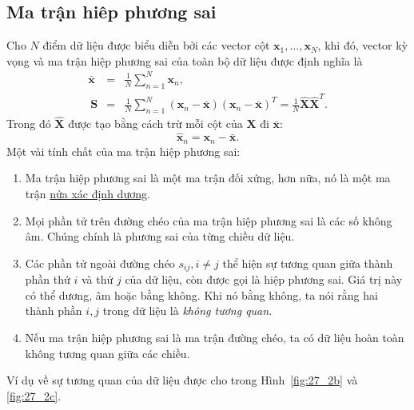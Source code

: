 \subsection{Ma trận hiêp phương sai}
 
Cho $N$ điểm dữ liệu được biểu diễn bởi các vector cột $\mathbf{x}_1, \dots, \mathbf{x}_N$, khi đó, {vector kỳ vọng} và {ma trận hiệp phương sai} của toàn bộ dữ liệu được định nghĩa là
\begin{eqnarray} 
    \bar{\mathbf{x}} &=& \frac{1}{N} \sum_{n=1}^N \mathbf{x}_n, \\\ 
    \mathbf{S} &=&  \frac{1}{N}\sum_{n=1}^N (\mathbf{x}_n - \bar{\mathbf{x}})(\mathbf{x}_n - \bar{\mathbf{x}})^T = \frac{1}{N}\hat{\mathbf{X}}\hat{\mathbf{X}}^T.
\end{eqnarray} 
Trong đó $\hat{\mathbf{X}}$ được tạo bằng cách trừ mỗi cột của $\mathbf{X}$ đi $\bar{\mathbf{x}}$: 
\begin{equation} 
    \hat{\mathbf{x}}_n = \mathbf{x}_n - \bar{\mathbf{x}}.
\end{equation} 
\newpage 
Một vài tính chất của ma trận hiệp phương sai: 
\begin{enumerate}

    \item Ma trận hiệp phương sai là một ma trận đối xứng, hơn nữa, nó là một ma trận \href{https://machinelearningcoban.com/2017/03/12/convexity/#positive-semidefinite}{nửa xác định dương}. 
     
    \item Mọi phần tử trên đường chéo của ma trận hiệp phương sai là các số không âm. Chúng chính là phương sai của từng chiều dữ liệu. 
     
    \item Các phần tử ngoài đường chéo $s_{ij}, i \neq j$ thể hiện sự tương quan
    giữa thành phần thứ $i$ và thứ $j$ của dữ liệu, còn được gọi là hiệp phương
    sai. Giá trị này có thể dương, âm hoặc bằng không. Khi nó bằng không, ta nói
    rằng hai thành phần $i, j$ trong dữ liệu là \textit{không tương quan}.
     
    \item Nếu ma trận hiệp phương sai là ma trận đường chéo, ta có dữ liệu hoàn toàn không tương quan giữa các chiều. 
\end{enumerate}
 
Ví dụ về sự tương quan của dữ liệu được cho trong Hình~\ref{fig:27_2b} và
\ref{fig:27_2c}.%
 
